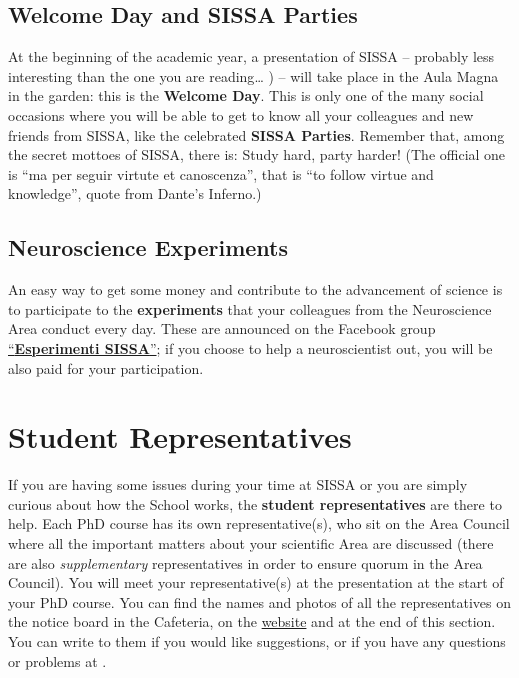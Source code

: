 \documentclass{sissavademecum}
\begin{document}
\section{Welcome Day and SISSA Parties}

At the beginning of the academic year, a presentation of SISSA -- probably less interesting than the one you are reading{\dots} ) -- will take place in the Aula Magna in the garden: this is the \textbf{Welcome Day}. This is only one of the many social occasions where you will be able to get to know all your colleagues and new friends from SISSA, like the celebrated \textbf{SISSA Parties}. Remember that, among the secret mottoes of SISSA, there is: Study hard, party harder! (The official one is ``ma per seguir virtute et canoscenza'', that is ``to follow virtue and knowledge'', quote from Dante's Inferno.) 


\section{Neuroscience Experiments}

An easy way to get some money and contribute to the advancement of science is to participate to the \textbf{experiments} that your colleagues from the Neuroscience Area conduct every day. These are announced on the Facebook group \href{https://www.facebook.com/groups/144096472323480}{``\textbf{Esperimenti SISSA}{}''}; if you choose to help a neuroscientist out, you will be also paid for your participation. 


\chapter{Student Representatives}

If you are having some issues during your time at SISSA or you are simply curious about how the School works, the \textbf{student representatives} are there to help. Each PhD course has its own representative(s), who sit on the Area Council where all the important matters about your scientific Area are discussed (there are also \emph{supplementary} representatives in order to ensure quorum in the Area Council). You will meet your representative(s) at the presentation at the start of your PhD course. You can find the names and photos of all the representatives on the notice board in the Cafeteria, on the \href{http://students.sissa.it/}{website} and at the end of this section. You can write to them if you would like suggestions, or if you have any questions or problems at .
\end{document}
